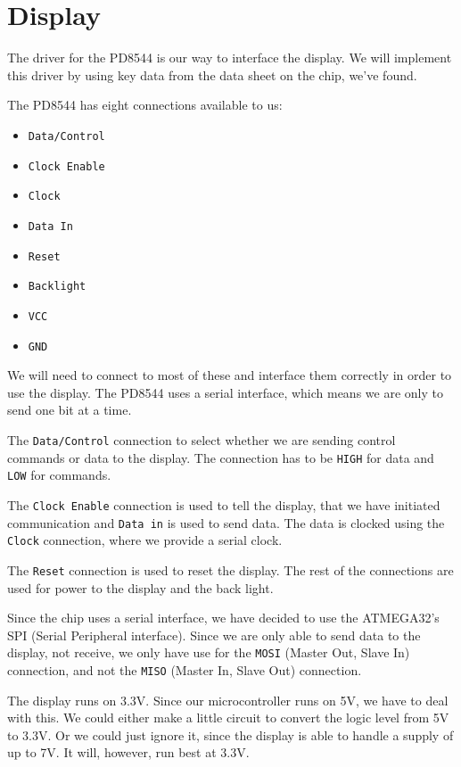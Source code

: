 \section{Display}

The driver for the PD8544 is our way to interface the display. We will implement this driver by using key data from the data sheet on the chip, we've found.

The PD8544 has eight connections available to us\cite{philips:pcd8544}:
\begin{itemize}
\item \texttt{Data/Control}
\item \texttt{Clock Enable}
\item \texttt{Clock}
\item \texttt{Data In}
\item \texttt{Reset}
\item \texttt{Backlight}
\item \texttt{VCC}
\item \texttt{GND}
\end{itemize}

We will need to connect to most of these and interface them correctly in order to use the display. The PD8544 uses a serial interface, which means we are only to send one bit at a time.

The \texttt{Data/Control} connection to select whether we are sending control commands or data to the display. The connection has to be \texttt{HIGH} for data and \texttt{LOW} for commands\cite{philips:pcd8544}.

The \texttt{Clock Enable} connection is used to tell the display, that we have initiated communication and \texttt{Data in} is used to send data. The data is clocked using the \texttt{Clock} connection, where we provide a serial clock.

The \texttt{Reset} connection is used to reset the display. The rest of the connections are used for power to the display and the back light.

Since the chip uses a serial interface, we have decided to use the ATMEGA32's SPI (Serial Peripheral interface). 
Since we are only able to send data to the display, not receive, we only have use for the \texttt{MOSI} (Master Out, Slave In) connection, and not the \texttt{MISO} (Master In, Slave Out) connection.

The display runs on 3.3V. Since our microcontroller runs on 5V, we have to deal with this. 
We could either make a little circuit to convert the logic level from 5V to 3.3V. Or we could just ignore it, since the display is able to handle a supply of up to 7V. It will, however, run best at 3.3V.


